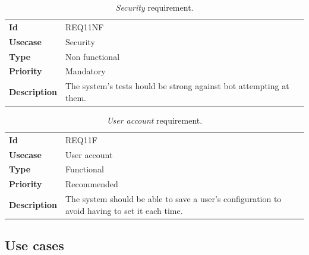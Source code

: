 \begin{table}[h!t]
    \centering
    \caption{\emph{Security} requirement.}
    \label{tab:req:security}
    \centering
    \begin{tabular}{l | p{80mm}}
        \textbf{Id}          & REQ11NF                                                            \\
        \textbf{Usecase}     & Security                                                           \\
        \textbf{Type}        & Non functional                                                     \\
        \textbf{Priority}    & Mandatory                                                          \\
        \textbf{Description} & The system's tests hould be strong against bot attempting at them.
    \end{tabular}
\end{table}

\begin{table}[h!t]
    \centering
    \caption{\emph{User account} requirement.}
    \label{tab:req:account}
    \centering
    \begin{tabular}{l | p{80mm}}
        \textbf{Id}          & REQ11F                                                                                        \\
        \textbf{Usecase}     & User account                                                                                  \\
        \textbf{Type}        & Functional                                                                                    \\
        \textbf{Priority}    & Recommended                                                                                   \\
        \textbf{Description} & The system should be able to save a user's configuration to avoid having to set it each time.
    \end{tabular}
\end{table}

\clearpage
\subsection{Use cases}

